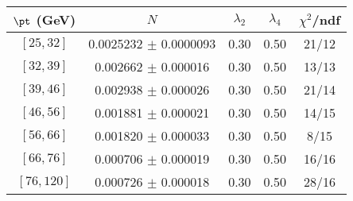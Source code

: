 \begin{tabular}{c||c|c|c|c}
$\pt$ (GeV) & $N$ & $\lambda_{2}$ & $\lambda_4$  & $\chi^2$/ndf  \\
\hline
$[25, 32]$ & 0.0025232 $\pm$ 0.0000093 & 0.30 & 0.50 & 21/12\\
$[32, 39]$ & 0.002662 $\pm$ 0.000016 & 0.30 & 0.50 & 13/13\\
$[39, 46]$ & 0.002938 $\pm$ 0.000026 & 0.30 & 0.50 & 21/14\\
$[46, 56]$ & 0.001881 $\pm$ 0.000021 & 0.30 & 0.50 & 14/15\\
$[56, 66]$ & 0.001820 $\pm$ 0.000033 & 0.30 & 0.50 & 8/15\\
$[66, 76]$ & 0.000706 $\pm$ 0.000019 & 0.30 & 0.50 & 16/16\\
$[76, 120]$ & 0.000726 $\pm$ 0.000018 & 0.30 & 0.50 & 28/16\\
\end{tabular}
